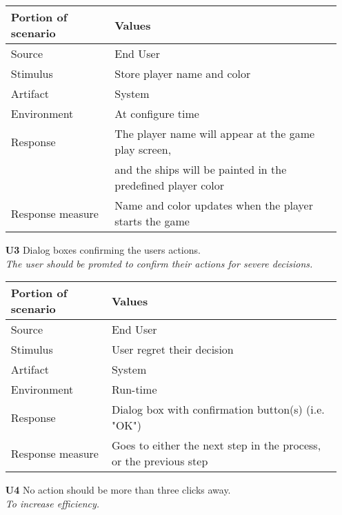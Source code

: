 \begin{itemize}
        \begin{tabular}{| l | l |}
            \hline
            \rowcolor[gray]{0.8}
            \textbf{Portion of scenario} & \textbf{Values} \\
            \hline
            Source & End User \\
            Stimulus & Store player name and color \\
            Artifact & System \\
            Environment & At configure time \\
            Response & The player name will appear at the game play screen, \\
             & and the ships will be painted in the predefined player color  \\
            Response measure & Name and color updates when the player starts the game \\
            \hline
        \end{tabular}

        \item[\textbf{U3}] Dialog boxes confirming the users actions. \\
        \textit{\small{The user should be promted to confirm their actions for severe decisions.}}
        
        \begin{tabular}{| l | l |}
            \hline
            \rowcolor[gray]{0.8}
            \textbf{Portion of scenario} & \textbf{Values} \\
            \hline
            Source & End User \\
            Stimulus & User regret their decision \\
            Artifact & System \\
            Environment & Run-time \\
            Response & Dialog box with confirmation button(s) (i.e. "OK") \\
            Response measure & Goes to either the next step in the process, or the previous step \\
            \hline
        \end{tabular}
        
        \newpage
        
        \item[\textbf{U4}] No action should be more than three clicks away. \\
        \textit{\small{To increase efficiency.}}
        

\end{itemize}
